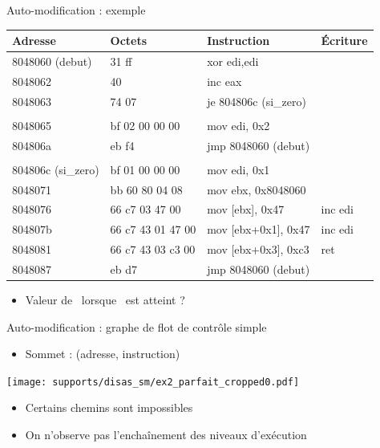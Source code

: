 \documentclass{beamer}
\begin{document}
\begin{frame}{Auto-modification : exemple}
\begin{tabular}[b]{|l|l|l|l|}
\hline
Adresse & Octets & Instruction & Écriture\\ 
\hline
 8048060 (debut)  &  31 ff             &  xor    edi,edi		& \\
 8048062  &  40                        &  inc    eax			& \\
 8048063  &  74 07                     &  je     804806c (si\_zero) 	& \\
 	  &			       &				& \\
 8048065  &  bf 02 00 00 00            &  mov    edi, 0x2 		& \\
 804806a  &  eb f4                     &  jmp    8048060 (debut) 	& \\
	  &			       &				& \\
 804806c (si\_zero) &  bf 01 00 00 00  &  mov    edi, 0x1 		& \\
 8048071  &  bb 60 80 04 08            &  mov    ebx, 0x8048060 	& \\
 8048076  &  66 c7 03 47 00            &  mov    [ebx], 0x47 		& inc edi\\
 804807b  &  66 c7 43 01 47 00         &  mov    [ebx+0x1], 0x47	& inc edi \\
 8048081  &  66 c7 43 03 c3 00         &  mov    [ebx+0x3], 0xc3	& ret \\
 8048087  &  eb d7                     &  jmp    8048060 (debut) 	& \\
\hline
\end{tabular}
\begin{itemize}
 \item Valeur de \edi\ lorsque \ret\ est atteint ?
\end{itemize}

\end{frame}

\begin{frame}{Auto-modification : graphe de flot de contrôle simple}
\begin{itemize}
 \item Sommet : (adresse, instruction)
\end{itemize}

\begin{center}
 \texttt{[image: supports/disas\_sm/ex2\_parfait\_cropped0.pdf]}
 \end{center}
\pause
\begin{itemize}
 \item Certains chemins sont impossibles
 \item On n'observe pas l'enchaînement des niveaux d'exécution
\end{itemize}
\end{frame}
\end{document}
